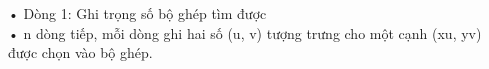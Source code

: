 • Dòng 1: Ghi trọng số bộ ghép tìm được   
\\   • n dòng tiếp, mỗi dòng ghi hai số (u, v) tượng trưng cho một cạnh (xu, yv) được chọn vào bộ ghép.  

\